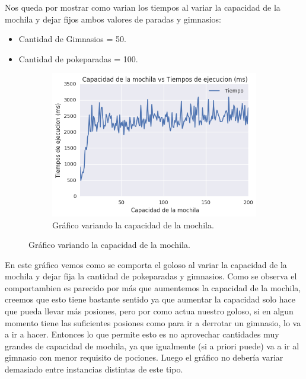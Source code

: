 Nos queda por mostrar como varian los tiempos al variar la capacidad de la mochila y dejar fijos ambos valores de paradas y gimnasios:

\begin{itemize}
\item Cantidad de Gimnasios = 50.
\item Cantidad de pokeparadas = 100.
\end{itemize}

\begin{figure}[H]
  \begin{center}	
    \begin{subfigure}[b]{0.70\textwidth}
        \includegraphics[width=\textwidth]{img/ejercicio2/losPosta/grafico.png}
        \caption{Gráfico variando la capacidad de la mochila.}
        \label{fig: ejercicio1_ejemplo_camino1_2}
 \end{subfigure}
  \end{center}
\end{figure}

En este gráfico vemos como se comporta el goloso al variar la capacidad de la mochila y dejar fija la cantidad de pokeparadas y gimnasios.
Como se observa el comportambien es parecido por más que aumentemos la capacidad de la mochila, creemos que esto tiene bastante sentido ya que
aumentar la capacidad solo hace que pueda llevar más posiones, pero por como actua nuestro goloso, si en algun momento tiene las suficientes posiones como para ir a 
derrotar un gimnasio, lo va a ir a hacer. Entonces lo que permite esto es no aprovechar cantidades muy grandes de capacidad de mochila, ya que igualmente (si a priori puede) va a ir al gimnasio con menor
requisito de pociones. Luego el gráfico no debería variar demasiado entre instancias distintas de este tipo.

